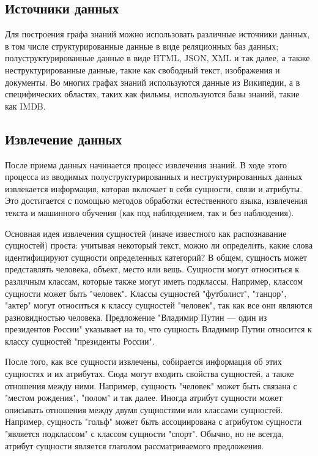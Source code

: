 \subsection{Источники данных}

Для построения графа знаний можно использовать различные источники данных, в том числе структурированные данные в виде реляционных баз
данных; полуструктурированные данные в виде HTML, JSON, XML и так далее, а также неструктурированные данные, такие как свободный текст,
изображения и документы. Во многих графах знаний используются данные из Википедии, а в специфических областях, таких как фильмы,
используются базы знаний, такие как IMDB.

\subsection{Извлечение данных}

После приема данных начинается процесс извлечения знаний. В ходе этого процесса из вводимых полуструктурированных и неструктурированных
данных извлекается информация, которая включает в себя сущности, связи и атрибуты. Это достигается с помощью методов обработки естественного
языка, извлечения текста и машинного обучения (как под наблюдением, так и без наблюдения).

Основная идея извлечения сущностей (иначе известного как распознавание сущностей) проста: учитывая некоторый текст, можно ли определить,
какие слова идентифицируют сущности определенных категорий? В общем, сущность может представлять человека, объект, место или вещь. Сущности
могут относиться к различным классам, которые также могут иметь подклассы. Например, классом сущности может быть "человек". Классы сущностей
"футболист", "танцор", "актер" могут относиться к классу сущностей "человек", так как все они являются разновидностью человека. Предложение
"Владимир Путин — один из президентов России" указывает на то, что сущность Владимир Путин относится к классу сущностей "президенты России".

После того, как все сущности извлечены, собирается информация об этих сущностях и их атрибутах. Сюда могут входить свойства сущностей, а
также отношения между ними. Например, сущность "человек" может быть связана с "местом рождения", "полом" и так далее. Иногда атрибут сущности
может описывать отношения между двумя сущностями или классами сущностей. Например, сущность "гольф" может быть ассоциирована с атрибутом
сущности "является подклассом" с классом сущности "спорт". Обычно, но не всегда, атрибут сущности является глаголом рассматриваемого предложения.


